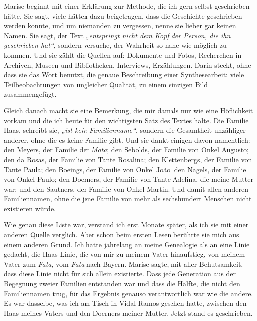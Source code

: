 \documentclass[
  ngerman,
  11pt,
  openany]{book}
\begin{document}
Marise beginnt mit einer Erklärung zur Methode, die ich gern selbst
geschrieben hätte. Sie sagt, viele hätten dazu beigetragen, dass die
Geschichte geschrieben werden konnte, und um niemanden zu vergessen,
nenne sie lieber gar keinen Namen. Sie sagt, der Text \emph{„entspringt
nicht dem Kopf der Person, die ihn geschrieben hat``}, sondern versuche,
der Wahrheit so nahe wie möglich zu kommen. Und sie zählt die Quellen
auf: Dokumente und Fotos, Recherchen in Archiven, Museen und
Bibliotheken, Interviews, Erzählungen. Darin steckt, ohne dass sie das
Wort benutzt, die genaue Beschreibung einer Synthesearbeit: viele
Teilbeobachtungen von ungleicher Qualität, zu einem einzigen Bild
zusammengefügt.

Gleich danach macht sie eine Bemerkung, die mir damals nur wie eine
Höflichkeit vorkam und die ich heute für den wichtigsten Satz des Textes
halte. Die Familie Haas, schreibt sie, \emph{„ist kein Familienname``},
sondern die Gesamtheit unzähliger anderer, ohne die es keine Familie
gibt. Und sie dankt einigen davon namentlich: den Meyers, der Familie
der \emph{Mota}; den Sebolds, der Familie von Onkel Augusto; den da
Rosas, der Familie von Tante Rosalina; den Klettenbergs, der Familie von
Tante Paula; den Boeings, der Familie von Onkel João; den Nagels, der
Familie von Onkel Paulo; den Doerners, der Familie von Tante Adelina,
die meine Mutter war; und den Sautners, der Familie von Onkel Martin.
Und damit allen anderen Familiennamen, ohne die jene Familie von mehr
als sechshundert Menschen nicht existieren würde.

Wie genau diese Liste war, verstand ich erst Monate später, als ich sie
mit einer anderen Quelle verglich. Aber schon beim ersten Lesen berührte
sie mich aus einem anderen Grund. Ich hatte jahrelang an meine
Genealogie als an eine Linie gedacht, die Haas-Linie, die von mir zu
meinem Vater hinaufstieg, von meinem Vater zum \emph{Fata}, vom
\emph{Fata} nach Bayern. Marise sagte, mit aller Behutsamkeit, dass
diese Linie nicht für sich allein existierte. Dass jede Generation aus
der Begegnung zweier Familien entstanden war und dass die Hälfte, die
nicht den Familiennamen trug, für das Ergebnis genauso verantwortlich
war wie die andere. Es war dasselbe, was ich am Tisch in Vidal Ramos
gesehen hatte, zwischen den Haas meines Vaters und den Doerners meiner
Mutter. Jetzt stand es geschrieben.
\end{document}
